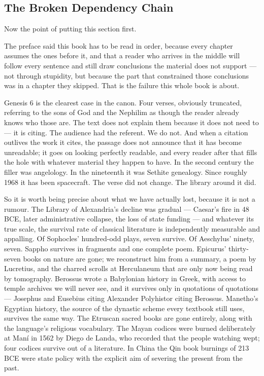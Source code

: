 \subsection{The Broken Dependency Chain}\label{sec:dependencychain}

Now the point of putting this section first.

The preface said this book has to be read in order, because every chapter assumes the ones
before it, and that a reader who arrives in the middle will follow every sentence and still
draw conclusions the material does not support --- not through stupidity, but because the part
that constrained those conclusions was in a chapter they skipped. That is the failure this
whole book is about. 

Genesis 6 is the clearest case in the canon. Four verses, obviously truncated, referring to
the sons of God and the Nephilim as though the reader already knows who those are. The text
does not explain them because it does not need to --- it is citing. The audience had the
referent. We do not. And when a citation outlives the work it cites, the passage does not
announce that it has become unreadable; it goes on looking perfectly readable, and every
reader after that fills the hole with whatever material they happen to have. In the second
century the filler was angelology. In the nineteenth it was Sethite genealogy. Since roughly
1968 it has been spacecraft. The verse did not change. The library around it did.

So it is worth being precise about what we have actually lost, because it is not a rumour.
The Library of Alexandria's decline was gradual --- Caesar's fire in 48 BCE, later
administrative collapse, the loss of state funding --- and whatever its true scale, the
survival rate of classical literature is independently measurable and appalling. Of Sophocles'
hundred-odd plays, seven survive. Of Aeschylus' ninety, seven. Sappho survives in fragments
and one complete poem. Epicurus' thirty-seven books on nature are gone; we reconstruct him
from a summary, a poem by Lucretius, and the charred scrolls at Herculaneum that are only now
being read by tomography. Berossus wrote a Babylonian history in Greek, with access to temple
archives we will never see, and it survives only in quotations of quotations --- Josephus and
Eusebius citing Alexander Polyhistor citing Berossus. Manetho's Egyptian history, the source
of the dynastic scheme every textbook still uses, survives the same way. The Etruscan sacred
books are gone entirely, along with the language's religious vocabulary. The Mayan codices
were burned deliberately at Man\'i in 1562 by Diego de Landa, who recorded that the people
watching wept; four codices survive out of a literature. In China the Qin book burnings of
213 BCE were state policy with the explicit aim of severing the present from the past.


